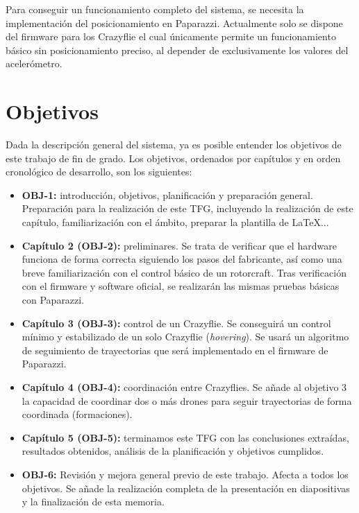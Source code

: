 Para conseguir un funcionamiento completo del sistema, se necesita la implementación del posicionamiento en Paparazzi. 
Actualmente solo se dispone del firmware para los Crazyflie \cite{paparazzi_crazyflie} 
el cual únicamente permite un funcionamiento básico sin posicionamiento preciso,
al depender de exclusivamente los valores del acelerómetro.


\section{Objetivos}

Dada la descripción general del sistema, ya es posible entender los objetivos de este trabajo de fin de grado. Los objetivos, ordenados por capítulos y en orden cronológico de desarrollo, son los siguientes:

\begin{itemize}
    \item \textbf{OBJ-1:} introducción, objetivos, planificación y preparación general. 
    Preparación para la realización de este TFG, incluyendo la realización de este capítulo, familiarización con el ámbito, preparar la plantilla de LaTeX...
    
    \item \textbf{Capítulo 2 (OBJ-2):} preliminares. 
    Se trata de verificar que el hardware funciona de forma correcta siguiendo los pasos del fabricante, así como una breve familiarización con el control básico de un rotorcraft. 
    Tras verificación con el firmware y software oficial, se realizarán las mismas pruebas básicas con Paparazzi.

    \item \textbf{Capítulo 3 (OBJ-3):} control de un Crazyflie. 
    Se conseguirá un control mínimo y estabilizado de un solo Crazyflie (\textit{hovering}).
    Se usará un algoritmo de seguimiento de trayectorias que será implementado en el firmware de Paparazzi.

    \item \textbf{Capítulo 4 (OBJ-4):} coordinación entre Crazyflies. 
    Se añade al objetivo 3 la capacidad de coordinar dos o más drones para seguir trayectorias de forma coordinada (formaciones).

    \item \textbf{Capítulo 5 (OBJ-5):} terminamos este TFG con las conclusiones extraídas, resultados obtenidos, análisis de la planificación y objetivos cumplidos.

    \item \textbf{OBJ-6:} Revisión y mejora general previo de este trabajo. Afecta a todos los objetivos.
    Se añade la realización completa de la presentación en diapositivas y la finalización de esta memoria.
\end{itemize}

